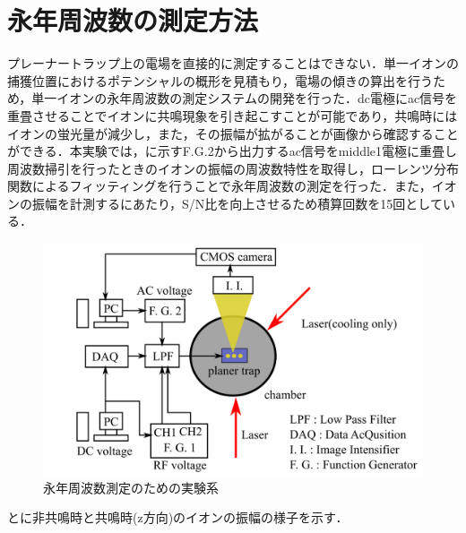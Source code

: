 \section{永年周波数の測定方法} \label{MeasSecFreq_Method}
プレーナートラップ上の電場を直接的に測定することはできない．単一イオンの捕獲位置におけるポテンシャルの概形を見積もり，電場の傾きの算出を行うため，単一イオンの永年周波数の測定システムの開発を行った．dc電極にac信号を重畳させることでイオンに共鳴現象を引き起こすことが可能であり，共鳴時にはイオンの蛍光量が減少し，また，その振幅が拡がることが画像から確認することができる．本実験では，に示すF.G.2から出力するac信号をmiddle1電極に重畳し周波数掃引を行ったときのイオンの振幅の周波数特性を取得し，ローレンツ分布関数によるフィッティングを行うことで永年周波数の測定を行った．また，イオンの振幅を計測するにあたり，S/N比を向上させるため積算回数を15回としている．

\begin{figure}[h]
	\centering
	\includegraphics[width = 0.6\linewidth]{./methods/figure/SecularFreqMeasSetup.png}
	\caption{永年周波数測定のための実験系}
	\label{fig:MeasSec_System}
\end{figure}

とに非共鳴時と共鳴時(z方向)のイオンの振幅の様子を示す．

